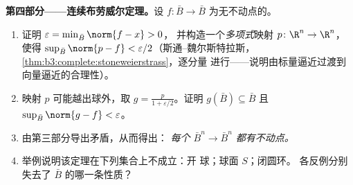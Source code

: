 \begin{problem}
\medskip
\noindent\textbf{第四部分——连续布劳威尔定理。}设
$f\colon\bar B\to\bar B$ 为无不动点的。
\begin{enumerate}[resume]
  \item 证明 $\varepsilon = \min_{\bar B}\norm{f - x} > 0$，
        并构造一个\emph{多项式}映射 $p\colon\R^n\to
        \R^n$，使得 $\sup_{\bar B}\norm{p - f} <
        \varepsilon/2$（斯通–魏尔斯特拉斯，
        \cref{thm:b3:complete:stoneweierstrass}，逐分量
        进行——说明由标量逼近过渡到
        向量逼近的合理性）。
  \item 映射 $p$ 可能越出球外，取 $g = \frac{p}{1
        + \varepsilon/2}$。证明 $g(\bar B) \subseteq \bar B$
        且 $\sup_{\bar B}\norm{g - f} < \varepsilon$。
  \item 由第三部分导出矛盾，从而得出：
        \emph{每个 $\bar B^n \to \bar B^n$
        都有不动点。}
  \item 举例说明该定理在下列集合上不成立：开
        球；球面 $S$；闭圆环。
        各反例分别失去了 $\bar B$ 的哪一条性质？
\end{enumerate}


\end{problem}
